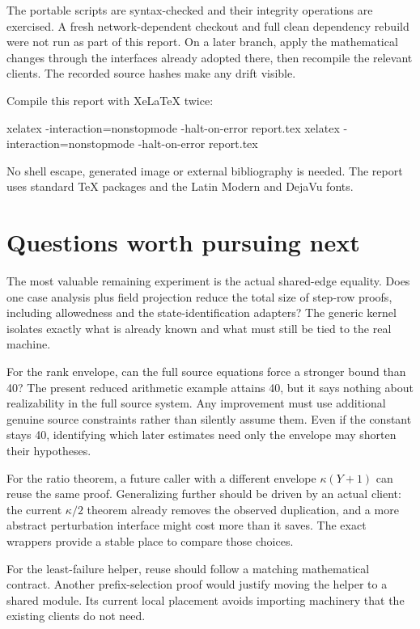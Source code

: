 \documentclass[11pt,a4paper]{article}
\begin{document}
The portable scripts are syntax-checked and their integrity operations are exercised. A fresh network-dependent checkout and full clean dependency rebuild were not run as part of this report. On a later branch, apply the mathematical changes through the interfaces already adopted there, then recompile the relevant clients. The recorded source hashes make any drift visible.

Compile this report with XeLaTeX twice:
\begin{Lean}
xelatex -interaction=nonstopmode -halt-on-error report.tex
xelatex -interaction=nonstopmode -halt-on-error report.tex
\end{Lean}
No shell escape, generated image or external bibliography is needed. The report uses standard TeX packages and the Latin Modern and DejaVu fonts.

\section{Questions worth pursuing next}

The most valuable remaining experiment is the actual shared-edge equality. Does one case analysis plus field projection reduce the total size of step-row proofs, including allowedness and the state-identification adapters? The generic kernel isolates exactly what is already known and what must still be tied to the real machine.

For the rank envelope, can the full source equations force a stronger bound than 40? The present reduced arithmetic example attains 40, but it says nothing about realizability in the full source system. Any improvement must use additional genuine source constraints rather than silently assume them. Even if the constant stays 40, identifying which later estimates need only the envelope may shorten their hypotheses.

For the ratio theorem, a future caller with a different envelope $\kappa(Y+1)$ can reuse the same proof. Generalizing further should be driven by an actual client: the current $\kappa/2$ theorem already removes the observed duplication, and a more abstract perturbation interface might cost more than it saves. The exact wrappers provide a stable place to compare those choices.

For the least-failure helper, reuse should follow a matching mathematical contract. Another prefix-selection proof would justify moving the helper to a shared module. Its current local placement avoids importing machinery that the existing clients do not need.
\end{document}
